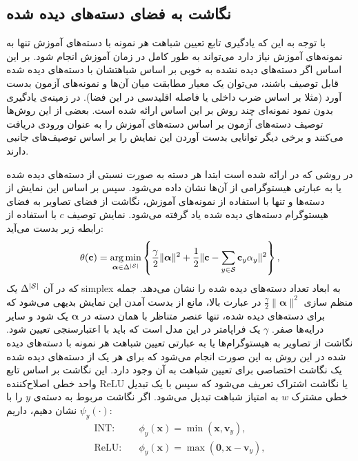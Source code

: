\subsection{نگاشت به فضای دسته‌های دیده شده}
با توجه به این که یادگیری تابع تعیین شباهت هر نمونه با دسته‌های آموزش تنها به نمونه‌های آموزش نیاز دارد می‌تواند به طور کامل در زمان آموزش انجام شود. بر این اساس اگر دسته‌های دیده نشده به خوبی بر اساس شباهتشان با دسته‌های دیده شده قابل توصیف باشند، می‌توان یک معیار مطابقت میان آن‌ها و نمونه‌های آزمون بدست آورد (مثلا بر اساس ضرب داخلی یا فاصله اقلیدسی در این فضا). در زمینه‌ی یادگیری بدون نمود نمونه‌ای چند روش بر این اساس ارائه شده است. بعضی از این روش‌ها توصیف دسته‌های آزمون بر اساس دسته‌های آموزش را به عنوان ورودی دریافت می‌کنند و برخی دیگر توانایی بدست آوردن این نمایش را بر اساس توصیف‌های جانبی دارند. 

در روشی که در 
\cite{sse}
ارائه شده است ابتدا هر دسته به صورت نسبتی از دسته‌های دیده شده یا به عبارتی هیستوگرامی از آن‌ها نشان داده می‌شود. سپس بر اساس این نمایش از دسته‌ها و تنها با استفاده از نمونه‌های آموزش، نگاشت از فضای تصاویر به فضای هیستوگرام دسته‌های دیده شده یاد گرفته می‌شود. نمایش توصیف $c$ با استفاده از رابطه زیر بدست می‌آید:
\begin{equation}\label{eqn:sse_source}
\theta(\mathbf{c})=
\operatorname*{arg\,min}_{\boldsymbol{\alpha}\in \Delta^{|{\cal S}|}} \left\{\frac{\gamma}{2}\|\boldsymbol{\alpha}\|^2+\frac{1}{2}\|\mathbf{c}-\sum_{y\in\mathcal{S}}\mathbf{c}_y \alpha_y\|^2\right\},
\end{equation}
که در آن 
$\Delta^{|{\cal S}|} $
یک \gls{simplex}  به ابعاد تعداد دسته‌های دیده شده را نشان می‌دهد. جمله منظم سازی $\frac{\gamma}{2}\|\boldsymbol{\alpha}\|^2$ در عبارت بالا، مانع از بدست آمدن این نمایش بدیهی می‌شود که برای دسته‌های دیده شده، تنها عنصر متناظر با همان دسته در $\boldsymbol{\alpha}$ یک شود و سایر درایه‌ها صفر. $\gamma$ یک فراپامتر در این مدل است که باید با اعتبارسنجی تعیین شود. 
نگاشت از تصاویر به هیستوگرام‌ها یا به عبارتی تعیین شباهت هر نمونه با دسته‌های دیده شده در این روش به این صورت انجام می‌شود که برای هر یک از دسته‌های دیده شده یک نگاشت اختصاصی برای تعیین شباهت به آن وجود دارد. 
این نگاشت بر اساس تابع واحد خطی اصلاح‌کننده ReLU یا نگاشت اشتراک 
 تعریف می‌شود که سپس با یک تبدیل خطی مشترک $w$ به امتیاز شباهت تبدیل می‌شود. اگر نگاشت مربوط به دسته‌ی $y$ را با $\psi_y(\cdot)$ نشان دهیم، داریم:
\begin{align}
\mbox{INT:} & \quad \phi_y(\mathbf{x})=\min(\mathbf{x}, \mathbf{v}_y), \label{eqn:int}\\
\mbox{ReLU:} & \quad \phi_y(\mathbf{x})=\max(\mathbf{0}, \mathbf{x}-\mathbf{v}_y), \label{eqn:relu}
\end{align}
